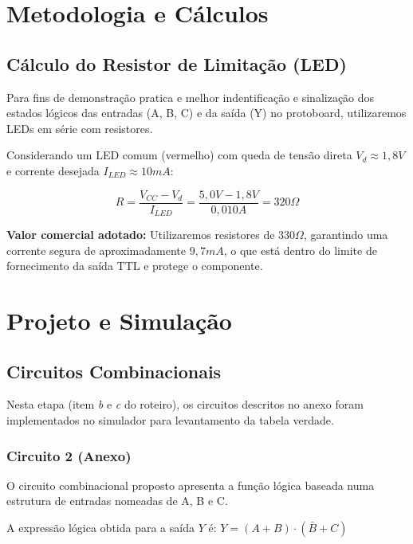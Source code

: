 \documentclass[11pt]{report}         %
\begin{document}
\chapter{Metodologia e Cálculos}

\section{Cálculo do Resistor de Limitação (LED)}

  Para fins de demonstração pratica e melhor indentificação e sinalização dos estados lógicos das entradas (A, B, C) e da saída (Y) no protoboard, 
  utilizaremos LEDs em série com resistores.

  Considerando um LED comum (vermelho) com queda de tensão direta $V_d \approx 1,8V$ e corrente desejada $I_{LED} \approx 10mA$:

  $$R = \frac{V_{CC} - V_d}{I_{LED}} = \frac{5,0V - 1,8V}{0,010A} = 320\Omega$$

  \textbf{Valor comercial adotado:} Utilizaremos resistores de \textbf{$330\Omega$}, garantindo uma corrente segura de aproximadamente $9,7mA$, 
  o que está dentro do limite de fornecimento da saída TTL e protege o componente.

\chapter{Projeto e Simulação}

\section{Circuitos Combinacionais}

  Nesta etapa (item \textit{b} e \textit{c} do roteiro), os circuitos descritos no anexo foram implementados no simulador para levantamento da tabela verdade.

\subsection{Circuito 2 (Anexo)}

  O circuito combinacional proposto apresenta a função lógica baseada numa estrutura de entradas nomeadas de A, B e C. 
  
  A expressão lógica obtida para a saída $Y$ é: $Y = (A + B) \cdot (\bar{B} + C)$
\end{document}
